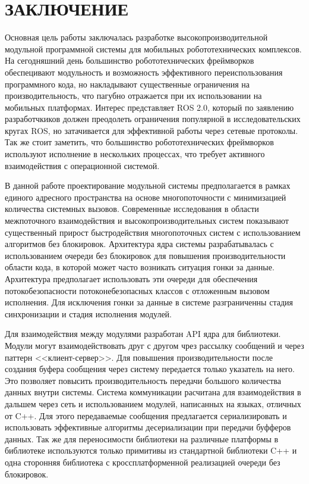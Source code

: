 \chapter*{ЗАКЛЮЧЕНИЕ}

Основная цель работы заключалась разработке высокопроизводительной модульной 
программной системы для мобильных робототехнических комплексов. На сегодняшний 
день большинство робототехнических фреймворков обеспецивают модульность и 
возможность эффективного переиспользования программного кода, но накладывают 
существенные ограничения на производительность, что пагубно отражается при их 
использовании на мобильных платформах. Интерес представляет ROS 2.0, который по 
заявлению разработчкиков должен преодолеть ограничения популярной в 
исследовательских кругах ROS, но затачивается для эффективной работы через 
сетевые протоколы. Так же стоит заметить, что большинство робототехнических 
фреймворков используют исполнение в нескольких процессах, что требует активного 
взаимодействия с операционной системой.

В данной работе проектирование модульной системы предполагается в рамках единого адресного пространства на основе многопоточности с минимизацией количества системных вызовов. Современные исследования в области межпоточного взаимодействия и высокопроизводительных систем показывают существенный прирост быстродействия многопоточных систем с использованием алгоритмов без блокировок. Архитектура ядра системы разрабатывалась с использованием очереди без блокировок для повышения производительности области кода, в которой может часто возникать ситуация гонки за данные. Архитектура предполагает использовать эти очереди для обеспечения потокобезопасности потоконебезопасных классов с отложенным вызовом исполнения. Для исключения гонки за данные в системе разграниченны стадия синхронизации и стадия исполнения модулей.

Для взаимодействия между модулями разработан API ядра для библиотеки. Модули могут взаимодействовать друг с другом чрез рассылку сообщений и через паттерн <<клиент-сервер>>. Для повышения производительности после создания буфера сообщения через систему передается только указатель на него. Это позволяет повысить производительность передачи большого количества данных внутри системы. Система коммуникации расчитана для взаимодействия в дальшем через сеть и использованием модулей, написанных на языках, отличных от C++. Для этого передаваемые сообщения предлагается сериализировать и использовать эффективные алгоритмы десериализации при передачи буфферов данных. Так же для переносимости библиотеки на различные платформы в библиотеке используются только примитивы из стандартной библиотеки C++ и одна сторонняя библиотека с кроссплатформенной реализацией очереди без блокировок.

